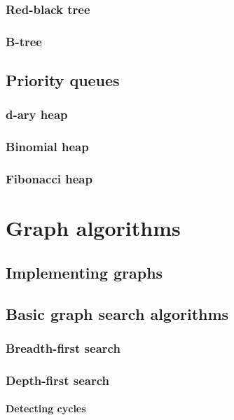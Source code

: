 \documentclass[oneside]{book}
\begin{document}
\section{Red-black tree}

\section{B-tree}

\chapter{Priority queues}

\section{d-ary heap}

\section{Binomial heap}

\section{Fibonacci heap}

\part{Graph algorithms}

\chapter{Implementing graphs}

\chapter{Basic graph search algorithms}

\section{Breadth-first search}

\section{Depth-first search} 

\subsection{Detecting cycles}
\end{document}
